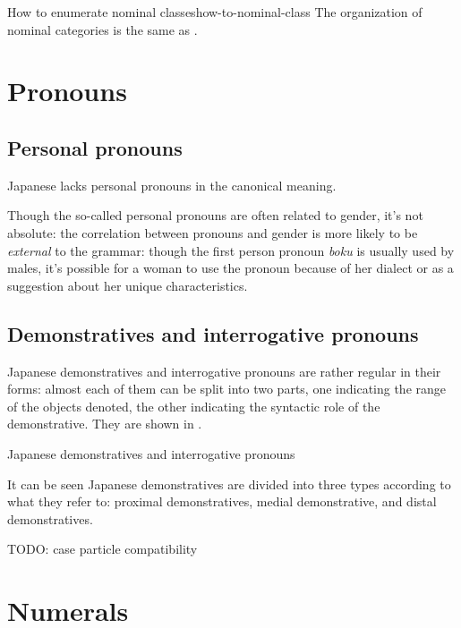 \documentclass[UTF8, a4paper, oneside, scheme=plain]{ctexrep}
\newcommand*{\citechap}[1]{chap.~{#1}}
\newcommand{\corpus}[1]{\emph{#1}}
\begin{document}
\begin{theorybox}{How to enumerate nominal classes}{how-to-nominal-class}
    The organization of nominal categories is the same as \citet[\citechap{3}, \citechap{4}]{Friesen2017}.
\end{theorybox}

\section{Pronouns}

\subsection{Personal pronouns}\label{sec:personal-pronoun}

Japanese lacks personal pronouns in the canonical meaning.

Though the so-called personal pronouns are often related to gender, 
it's not absolute: 
the correlation between pronouns and gender is more likely 
to be \emph{external} to the grammar:
though the first person pronoun \corpus{boku} is usually used by males,
it's possible for a woman to use the pronoun 
because of her dialect or
as a suggestion about her unique characteristics.

\subsection{Demonstratives and interrogative pronouns}

Japanese demonstratives and interrogative pronouns are rather regular in their forms:
almost each of them can be split into two parts,
one indicating the range of the objects denoted,
the other indicating the syntactic role of the demonstrative.
They are shown in .

\begin{table}[H]
    \centering
    \caption{Japanese demonstratives and interrogative pronouns}
    \label{tbl:demonstrative}
     
\end{table}

It can be seen Japanese demonstratives are divided into three types according to what they refer to: 
proximal demonstratives, medial demonstrative, and distal demonstratives.

TODO: case particle compatibility

\section{Numerals}
\end{document}
